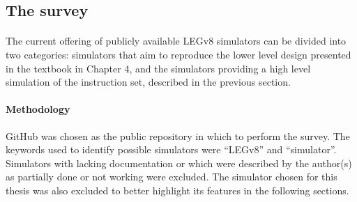 \subsection{The survey}

\paragraph{}
The current offering of publicly available LEGv8 simulators can be divided into two categories: simulators that aim to reproduce the lower level design presented in the textbook \cite{patterson2016computer} in Chapter 4, and the simulators providing a high level simulation of the instruction set, described in the previous section.
\paragraph{Methodology}
GitHub \cite{githubweb} was chosen as the public repository in which to perform the survey. The keywords used to identify possible simulators were ``LEGv8'' and ``simulator''. Simulators with lacking documentation or which were described by the author(s) as partially done or not working were excluded. The simulator chosen for this thesis was also excluded to better highlight its features in the following sections.

